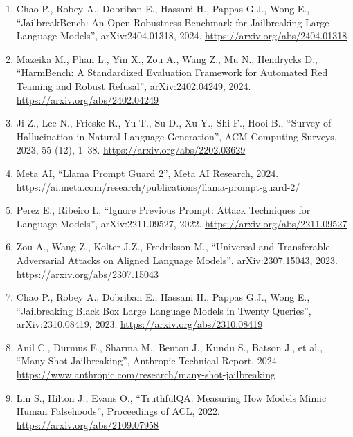 \documentclass[12pt,a4paper]{article}
\begin{document}
\begin{enumerate}[leftmargin=*, label=\arabic*.]

\item Chao P., Robey A., Dobriban E., Hassani H., Pappas G.J., Wong E.,
      ``JailbreakBench: An Open Robustness Benchmark for Jailbreaking Large
      Language Models'', arXiv:2404.01318, 2024.
      \url{https://arxiv.org/abs/2404.01318}

\item Mazeika M., Phan L., Yin X., Zou A., Wang Z., Mu N., Hendrycks D.,
      ``HarmBench: A Standardized Evaluation Framework for Automated Red
      Teaming and Robust Refusal'', arXiv:2402.04249, 2024.
      \url{https://arxiv.org/abs/2402.04249}

\item Ji Z., Lee N., Frieske R., Yu T., Su D., Xu Y., Shi F., Hooi B.,
      ``Survey of Hallucination in Natural Language Generation'',
      ACM Computing Surveys, 2023, 55 (12), 1--38.
      \url{https://arxiv.org/abs/2202.03629}

\item Meta AI, ``Llama Prompt Guard 2'', Meta AI Research, 2024.
      \url{https://ai.meta.com/research/publications/llama-prompt-guard-2/}

\item Perez E., Ribeiro I., ``Ignore Previous Prompt: Attack Techniques
      for Language Models'', arXiv:2211.09527, 2022.
      \url{https://arxiv.org/abs/2211.09527}

\item Zou A., Wang Z., Kolter J.Z., Fredrikson M., ``Universal and
      Transferable Adversarial Attacks on Aligned Language Models'',
      arXiv:2307.15043, 2023.
      \url{https://arxiv.org/abs/2307.15043}

\item Chao P., Robey A., Dobriban E., Hassani H., Pappas G.J., Wong E.,
      ``Jailbreaking Black Box Large Language Models in Twenty Queries'',
      arXiv:2310.08419, 2023.
      \url{https://arxiv.org/abs/2310.08419}

\item Anil C., Durmus E., Sharma M., Benton J., Kundu S., Batson J., et al.,
      ``Many-Shot Jailbreaking'', Anthropic Technical Report, 2024.
      \url{https://www.anthropic.com/research/many-shot-jailbreaking}

\item Lin S., Hilton J., Evans O., ``TruthfulQA: Measuring How Models
      Mimic Human Falsehoods'', Proceedings of ACL, 2022.
      \url{https://arxiv.org/abs/2109.07958}


\end{enumerate}
\end{document}
